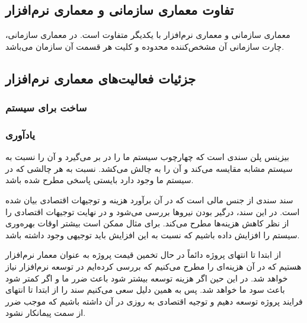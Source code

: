 \documentclass[a4paper]{article}
\begin{document}
\subsection{تفاوت معماری سازمانی و معماری نرم‌افزار}

معماری سازمانی و معماری نرم‌افزار با یکدیگر متفاوت است. در معماری سازمانی، چارت
سازمانی آن مشخص‌کننده محدوده و کلیت هر قسمت آن سازمان می‌باشد.





\subsection{جزئیات فعالیت‌های معماری نرم‌افزار}

\subsubsection{ساخت  برای سیستم}

\subsubsection*{یادآوری }
بیزینس پلن سندی است که چهارچوب سیستم ما را در بر می‌گیرد و آن را نسبت به سیستم
مشابه مقایسه می‌کند و آن را به چالش می‌کشد. نسبت به هر چالشی که در سیستم ما وجود
دارد بایستی پاسخی مطرح شده باشد.

سند  سندی از جنس مالی است که در آن برآورد هزینه و توجیهات
اقتصادی بیان شده است. در این سند، درگیر بودن نیرو‌ها بررسی می‌شود و در نهایت
توجیهات‌ اقتصادی را از نظر کاهش هزینه‌ها مطرح می‌کند. برای مثال ممکن است بیشتر
اوقات بهره‌وری سیستم را افزایش داده باشیم که نسبت به این افزایش باید توجیهی وجود
داشته باشد.

از ابتدا تا انتهای پروژه دائماً در حال تخمین قیمت پروژه به عنوان معمار نرم‌افزار
هستیم که در آن هزینه‌ای را مطرح می‌کنیم که بررسی کرده‌ایم در توسعه نرم‌افزار
نیاز خواهد شد. در این حین اگر هزینه توسعه بیشتر شود باعث ضرر ما و اگر کمتر شود
باعث سود ما خواهد شد. پس به همین دلیل سعی می‌کنیم سند  را از
ابتدا تا انتهای فرایند پروژه توسعه دهیم و توجیه اقتصادی به روزی در آن داشته
باشیم که موجب ضرر از سمت پیمانکار نشود.
\end{document}
